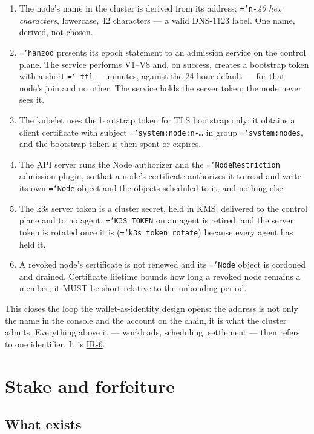 \documentclass[11pt,a4paper]{article}
\newcommand{\code}[1]{\texttt{\hyphenchar\font=`\-\relax #1}}
\begin{document}
\begin{enumerate}[label=\textbf{A\arabic*.},leftmargin=2.6em]
\item The node's name in the cluster is derived from its address:
  \code{n-}\textit{40 hex characters}, lowercase, 42 characters --- a valid
  DNS-1123 label. One name, derived, not chosen.
\item \code{hanzod} presents its epoch statement to an admission service on the
  control plane. The service performs V1--V8 and, on success, creates a bootstrap
  token with a short \code{--ttl} --- minutes, against the 24-hour default --- for
  that node's join and no other. The service holds the server token; the node
  never sees it.
\item The kubelet uses the bootstrap token for TLS bootstrap only: it obtains a
  client certificate with subject \code{system:node:n-\dots} in group
  \code{system:nodes}, and the bootstrap token is then spent or expires.
\item The API server runs the Node authorizer and the \code{NodeRestriction}
  admission plugin, so that a node's certificate authorizes it to read and write
  its own \code{Node} object and the objects scheduled to it, and nothing else.
\item The k3s server token is a cluster secret, held in KMS, delivered to the
  control plane and to no agent. \code{K3S\_TOKEN} on an agent is retired, and the
  server token is rotated once it is (\code{k3s token rotate}) because every agent
  has held it.
\item A revoked node's certificate is not renewed and its \code{Node} object is
  cordoned and drained. Certificate lifetime bounds how long a revoked node remains
  a member; it MUST be short relative to the unbonding period.
\end{enumerate}

This closes the loop the wallet-as-identity design opens: the address is not only
the name in the console and the account on the chain, it is what the cluster
admits. Everything above it --- workloads, scheduling, settlement --- then refers
to one identifier. It is \hyperref[sec:req]{IR-6}.

\section{Stake and forfeiture}
\label{sec:stake}

\subsection{What exists}
\end{document}
